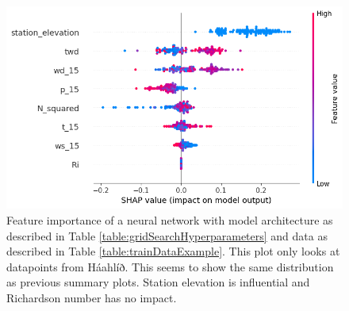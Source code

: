 \begin{figure}[H]
    \centering
    \includegraphics[scale = 0.6]{Figures/shap_plots/summary_plot_1470.png}
    \caption[Summary feature importance of a neural network only looking at AWS at Háahlíð.]{Feature importance of a neural network with model architecture as described in Table \ref{table:gridSearchHyperparameters} and data as described in Table \ref{table:trainDataExample}. This plot only looks at datapoints from Háahlíð. This seems to show the same distribution as previous summary plots. Station elevation is influential and Richardson number has no impact.}
    \label{fig:ShapleySummaryHaahlid}
\end{figure}